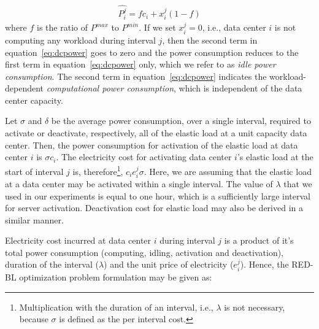 \begin{align}
\label{eq:dcpower}
\hat{P_i^j} = fc_i + x_i^j\left(1-f\right)
\end{align}
where $f$ is the ratio of $P^{max}$ to $P^{min}$. If we set $x_i^j=0$, i.e., data center $i$ is not computing any workload during interval $j$, then the second term in equation~\ref{eq:dcpower} goes to zero and the power consumption reduces to the first term in equation~\ref{eq:dcpower} only, which we refer to as \textit{idle power consumption}. The second term in equation~\ref{eq:dcpower} indicates the workload-dependent \textit{computational power consumption}, which is independent of the data center capacity.

Let $\sigma$ and $\delta$ be the average power consumption, over a single interval, required to activate or deactivate, respectively, all of the elastic load at a unit capacity data center. Then, the power consumption for activation of the elastic load at data center $i$ is $\sigma c_i$. The electricity cost for activating data center $i$'s elastic load at the start of interval $j$ is, therefore\footnote{Multiplication with the duration of an interval, i.e., $\lambda$ is not necessary, because $\sigma$ is defined as the per interval cost.}, $c_ie_i^j\sigma$. Here, we are assuming that the elastic load at a data center may be activated within a single interval. The value of $\lambda$ that we used in our experiments is equal to one hour, which is a sufficiently large interval for server activation. Deactivation cost for elastic load may also be derived in a similar manner. 

Electricity cost incurred at data center $i$ during interval $j$ is a product of it's total power consumption (computing, idling, activation and deactivation), duration of the interval ($\lambda$) and the unit price of electricity ($e_i^j$). Hence, the RED-BL optimization problem formulation may be given as:

